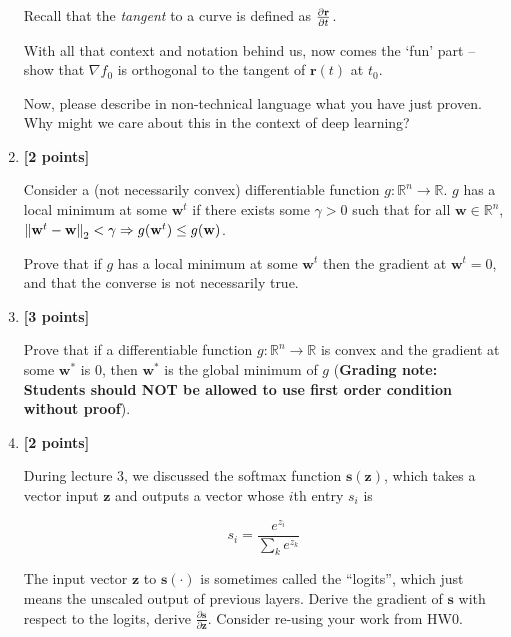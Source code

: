 \documentclass[11pt,english]{article}
\begin{document}
\begin{enumerate}[start]
Recall that the \emph{tangent} to a curve is defined as $\frac{\partial \mathbf{r}}{\partial t}$. 


With all that context and notation behind us, now comes the `fun' part -- 
show that $\nabla f_0$ is orthogonal to the tangent of $\mathbf{r}(t)$ at $t_0$. 

Now, please describe in non-technical language what you have just proven. Why might we care about this in the context of deep learning? 



\item
\textbf{[2 points]}

Consider a (not necessarily convex) differentiable function $g : \mathbb{R}^{n} \rightarrow \mathbb{R}$. $g$ has a local minimum at some $\mathbf{w}^{t}$ if there exists some $\gamma > 0$ such that for all $\mathbf{w} \in \mathbb{R}^{n}$, $\left| \hspace{-0.7pt}\left|\mathbf{w}^{t} - \mathbf{w}\right| \hspace{-0.7pt}\right|_{2} < \gamma \Rightarrow g(\mathbf{w}^{t}) \leq g(\mathbf{w})$.

Prove that if $g$ has a local minimum at some $\mathbf{w}^{t}$ then the gradient at $\mathbf{w}^{t} = 0$, and that the converse
is not necessarily true.

\item
\textbf{[3 points]}

Prove that if a differentiable function $g : \mathbb{R}^{n} \rightarrow \mathbb{R}$ is convex and the gradient
at some $\mathbf{w}^*$ is 0, then $\mathbf{w}^*$ is the global minimum of $g$ (\textbf{Grading note: Students should NOT be allowed to use first order condition without proof}).

\item
\textbf{[2 points]}

During lecture 3, we discussed the softmax function $\mathbf{s}(\mathbf{z})$, which takes a vector input $\mathbf{z}$ and outputs a vector whose $i$th entry $s_i$ is

\begin{equation}
s_i = \frac{e^{z_{i}}}{\sum_{k} e^{z_{k}}}
\end{equation}

The input vector $\mathbf{z}$ to $\mathbf{s}(\cdot)$ is sometimes called the ``logits'', which just means the unscaled output of previous layers. Derive the gradient of $\mathbf{s}$ with respect to the logits, \ie derive $\frac{\partial \mathbf{s}}{\partial \mathbf{z}}$. 
Consider re-using your work from HW0.


\end{enumerate}
\end{document}
